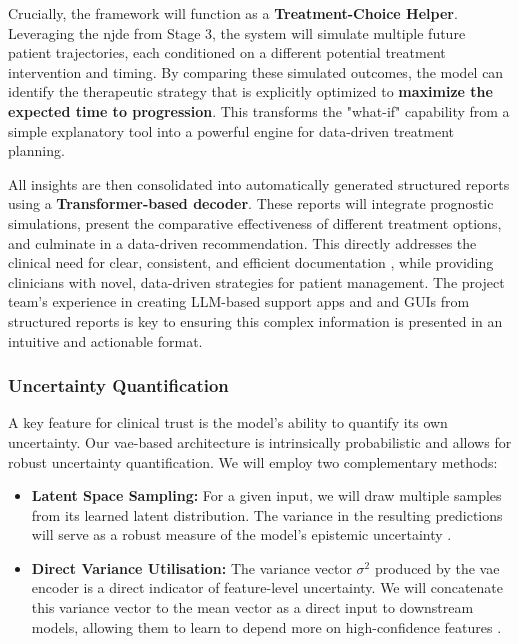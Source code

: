 \documentclass[11pt, a4paper]{article}
\begin{document}
Crucially, the framework will function as a \textbf{Treatment-Choice Helper}. Leveraging the \gls{njde} from Stage 3, the system will simulate multiple future patient trajectories, each conditioned on a different potential treatment intervention and timing. By comparing these simulated outcomes, the model can identify the therapeutic strategy that is explicitly optimized to \textbf{maximize the expected time to progression}. This transforms the "what-if" capability from a simple explanatory tool into a powerful engine for data-driven treatment planning.

All insights are then consolidated into automatically generated structured reports using a \textbf{Transformer-based decoder}. These reports will integrate prognostic simulations, present the comparative effectiveness of different treatment options, and culminate in a data-driven recommendation. This directly addresses the clinical need for clear, consistent, and efficient documentation \cite{JorgHalfmann2023, SacoranskyKwan2024}, while providing clinicians with novel, data-driven strategies for patient management. The project team's experience in creating LLM-based support apps and and GUIs from structured reports is key to ensuring this complex information is presented in an intuitive and actionable format.

\subsubsection{Uncertainty Quantification}
A key feature for clinical trust is the model's ability to quantify its own uncertainty. Our \gls{vae}-based architecture is intrinsically probabilistic and allows for robust uncertainty quantification. We will employ two complementary methods:
\begin{itemize}
    \item \textbf{Latent Space Sampling:} For a given input, we will draw multiple samples from its learned latent distribution. The variance in the resulting predictions will serve as a robust measure of the model's epistemic uncertainty \cite{BustinMeyer2025}.
    \item \textbf{Direct Variance Utilisation:} The variance vector $\sigma^2$ produced by the \gls{vae} encoder is a direct indicator of feature-level uncertainty. We will concatenate this variance vector to the mean vector as a direct input to downstream models, allowing them to learn to depend more on high-confidence features \cite{FriedrichFrisch2024}.
\end{itemize}
\end{document}
